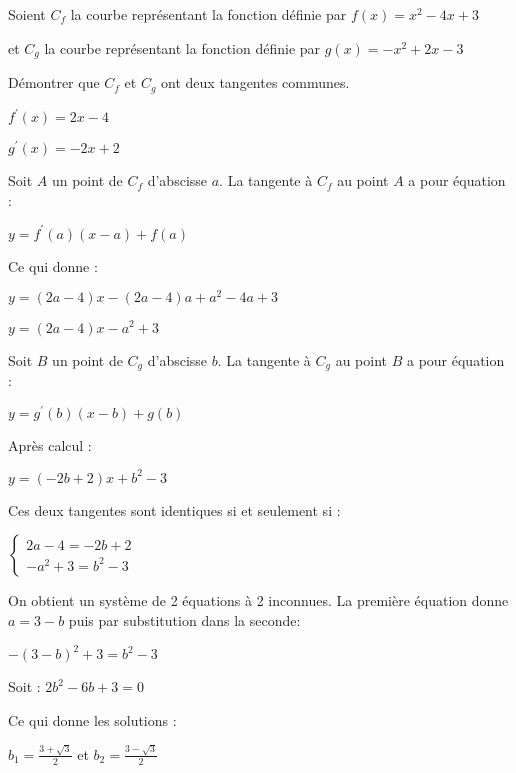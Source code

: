 
%
Soient $C_{f}$ la courbe représentant la fonction définie par $f\left(x\right)=x^{2}-4x+3$
\par
et $C_{g}$ la courbe représentant la fonction définie par $g\left(x\right)=-x^{2}+2x-3$
\par
Démontrer que $C_{f}$ et $C_{g}$ ont deux tangentes communes.
\begin{corrige}
     $f^{\prime}\left(x\right)=2x-4$
     \par
     $g^{\prime}\left(x\right)=-2x+2$
     \par
     Soit $A$ un point de $C_{f}$ d'abscisse $a$. La tangente à $C_{f}$ au point $A$ a pour équation :
     \par
     $y=f^{\prime}\left(a\right)\left(x-a\right)+f\left(a\right)$
     \par
     Ce qui donne :
     \par
     $y=\left(2a-4\right)x-\left(2a-4\right)a+a^{2}-4a+3$
     \par
     $y=\left(2a-4\right)x-a^{2}+3$
     \par
     Soit $B$ un point de $C_{g}$ d'abscisse $b$. La tangente à $C_{g}$ au point $B$ a pour équation :
     \par
     $y=g^{\prime}\left(b\right)\left(x-b\right)+g\left(b\right)$
     \par
     Après calcul :
     \par
     $y=\left(-2b+2\right)x+b^{2}-3$
     \par
     Ces deux tangentes sont identiques si et seulement si :
     \par
     $\left\{ \begin{matrix} 2a-4=-2b+2 \\ -a^{2}+3=b^{2}-3 \end{matrix}\right.$
          \par
          On obtient un système de 2 équations à 2 inconnues. La première équation donne $a=3-b$ puis par substitution dans la seconde:
          \par
          $-\left(3-b\right)^{2}+3=b^{2}-3$
          \par
          Soit : $2b^{2}-6b+3=0$
          \par
          Ce qui donne les solutions :
          \par
          $b_{1}=\frac{3+\sqrt{3}}{2}$ et $b_{2}=\frac{3-\sqrt{3}}{2}$
          \par

\end{corrige}
